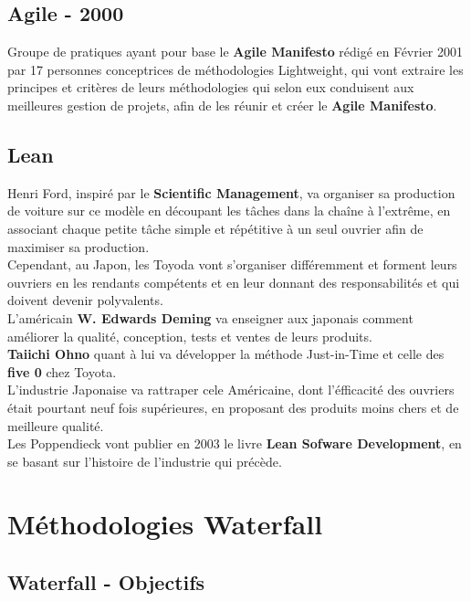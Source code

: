 \documentclass{report}
\begin{document}
	\section{Agile - 2000}

		Groupe de pratiques ayant pour base le \textbf{Agile Manifesto} rédigé en Février 2001 par 17 personnes conceptrices de méthodologies Lightweight, qui vont extraire les principes et critères de leurs méthodologies qui selon eux conduisent aux meilleures gestion de projets, afin de les réunir et créer le \textbf{Agile Manifesto}.\\

	\section{Lean}

		Henri Ford, inspiré par le \textbf{Scientific Management}, va organiser sa production de voiture sur ce modèle en découpant les tâches dans la chaîne à l'extrême, en associant chaque petite tâche simple et répétitive à un seul ouvrier afin de maximiser sa production.\\

		Cependant, au Japon, les Toyoda vont s'organiser différemment et forment leurs ouvriers en les rendants compétents et en leur donnant des responsabilités et qui doivent devenir polyvalents.\\

		L'américain \textbf{W. Edwards Deming} va enseigner aux japonais comment améliorer la qualité, conception, tests et ventes de leurs produits.\\
		\textbf{Taiichi Ohno} quant à lui va développer la méthode Just-in-Time et celle des \textbf{five 0} chez Toyota.\\

		L'industrie Japonaise va rattraper cele Américaine, dont l'éfficacité des ouvriers était pourtant neuf fois supérieures, en proposant des produits moins chers et de meilleure qualité.\\

		Les Poppendieck vont publier en 2003 le livre \textbf{Lean Sofware Development}, en se basant sur l'histoire de l'industrie qui précède.\\


\chapter{Méthodologies Waterfall}

	\section{Waterfall - Objectifs}
\end{document}
